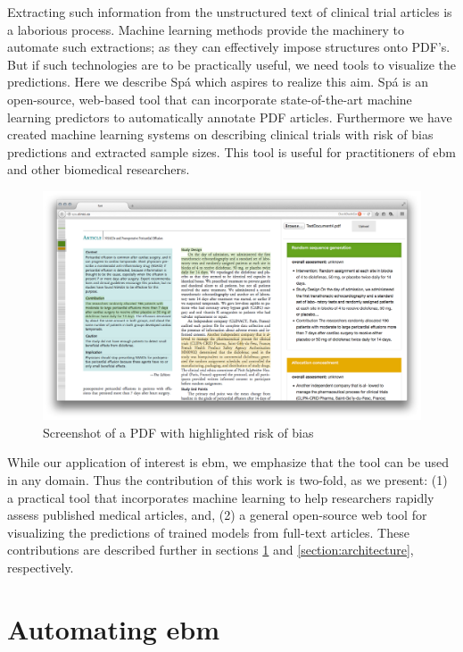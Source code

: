 \documentclass[runningheads,a4paper]{llncs}
\begin{document}
Extracting such information from the unstructured text of clinical trial articles is a laborious process.
Machine learning methods provide the machinery to automate such extractions; as they can effectively impose structures onto PDF's.
But if such technologies are to be practically useful, we need tools to visualize the predictions.
Here we describe Spá which aspires to realize this aim.
Spá is an open-source, web-based tool that can incorporate state-of-the-art machine learning predictors to automatically annotate PDF articles.
Furthermore we have created machine learning systems on describing clinical trials with risk of bias predictions and extracted sample sizes.
This tool is useful for practitioners of \ac{ebm} and other biomedical researchers.

\begin{figure}[htb]
\centering
\includegraphics[width=.9\linewidth]{./images/screenshot.png}
\caption{\label{fig:screensot}Screenshot of a PDF with highlighted risk of bias}
\end{figure}

While our application of interest is \ac{ebm}, we emphasize that the tool can be used in any domain.
Thus the contribution of this work is two-fold, as we present:
(1) a practical tool that incorporates machine learning to help researchers rapidly assess published medical articles, and,
(2) a general open-source web tool for visualizing the predictions of trained models from full-text articles.
These contributions are described further in sections \ref{section:EBM-ML} and \ref{section:architecture}, respectively.

\section{Automating \acl{ebm}}
\label{section:EBM-ML}
\end{document}
